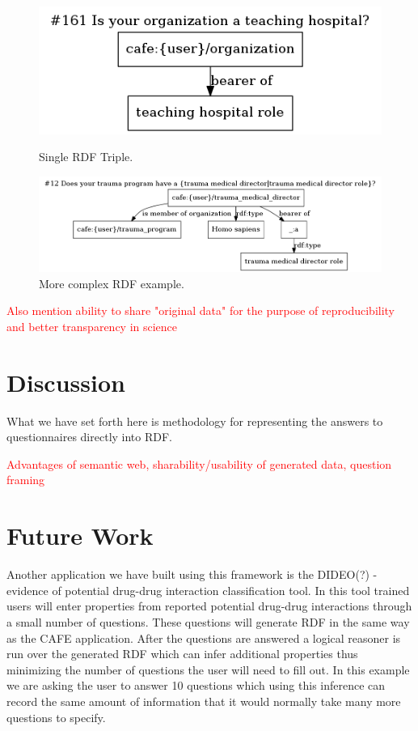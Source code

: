 \documentclass{amia}
\begin{document}
\begin{figure}[b]
  \centering
  \begin{minipage}[b]{0.32\textwidth}
    \includegraphics[width=\textwidth]{pics/161.png}
    \caption{Single RDF Triple.}
    \label{simple_rdf}
  \end{minipage}
  \hfill
  \begin{minipage}[b]{0.67\textwidth}
    \includegraphics[width=\textwidth]{pics/12.png}
    \caption{More complex RDF example.}
    \label{complex_rdf}
  \end{minipage}
\end{figure}

\textcolor{red}{Also mention ability to share "original data" for the purpose of reproducibility and better transparency in science}

\section*{Discussion}
What we have set forth here is methodology for representing the answers to questionnaires directly into RDF.

\textcolor{red}{Advantages of semantic web, sharability/usability of generated data, question framing}

\section*{Future Work}
Another application we have built using this framework is the DIDEO(?) - evidence of potential drug-drug interaction classification tool.
In this tool trained users will enter properties from reported potential drug-drug interactions through a small number of questions.
These questions will generate RDF in the same way as the CAFE application.
After the questions are answered a logical reasoner is run over the generated RDF which can infer additional properties thus minimizing the number of questions the user will need to fill out.
In this example we are asking the user to answer 10 questions which using this inference can record the same amount of information that it would normally take many more questions to specify.
\end{document}
